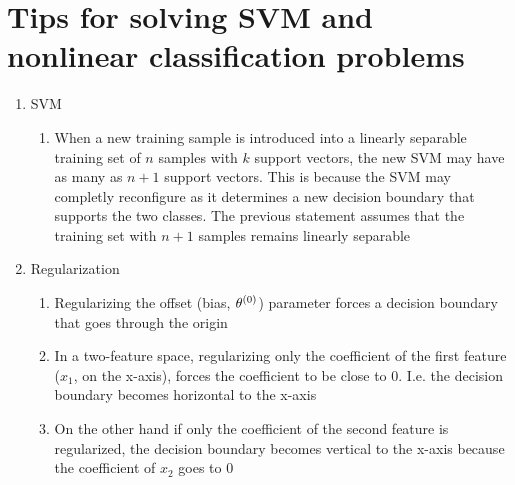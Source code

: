 \section {Tips for solving SVM and nonlinear classification problems}
\begin {enumerate}
\item SVM
  \begin {enumerate}
  \item When a new training sample is introduced into a linearly separable training set of $n$ samples with $k$ support vectors, the new SVM may have as many as $n+1$ support vectors. This is because the SVM may completly reconfigure as it determines a new decision boundary that supports the two classes. The previous statement assumes that the training set with $n+1$ samples remains linearly separable
  \end {enumerate}
\item Regularization
  \begin {enumerate}
  \item Regularizing the offset (bias, $\mathrm{\theta^{(0)}}$) parameter forces a decision boundary that goes through the origin
  \item In a two-feature space, regularizing only the coefficient of the first feature ($x_1$, on the x-axis), forces the coefficient to be close to $0$. I.e. the decision boundary becomes horizontal to the x-axis
  \item On the other hand if only the coefficient of the second feature is regularized, the decision boundary becomes vertical to the x-axis because the coefficient of $x_2$ goes to $0$
  \end {enumerate}
\end {enumerate}

